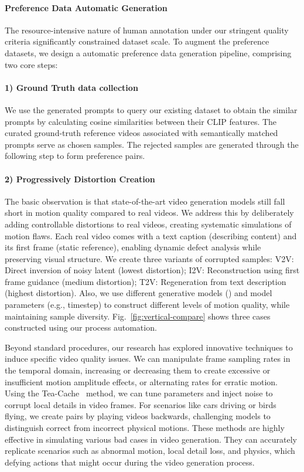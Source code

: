 \documentclass{article}
\begin{document}
{\paragraph{Preference Data Automatic Generation}
The resource-intensive nature of human annotation under our stringent quality criteria significantly constrained dataset scale. To augment the preference datasets, we design a automatic preference data generation pipeline, comprising two core steps: 
\paragraph{1) Ground Truth data collection}
We use the generated prompts to query our existing dataset to obtain the similar prompts by calculating cosine similarities between their CLIP features\cite{radford2021learning}. The curated ground-truth reference videos associated with semantically matched prompts serve as chosen samples. The rejected samples are generated through the following step to form preference pairs.
\paragraph{2) Progressively Distortion Creation}
The basic observation is that state-of-the-art video generation models still fall short in motion quality compared to real videos. We address this by deliberately adding controllable distortions to real videos, creating systematic simulations of motion flaws. Each real video comes with a text caption (describing content) and its first frame (static reference), enabling dynamic defect analysis while preserving visual structure. We create three variants of corrupted samples: V2V: Direct inversion of noisy latent (lowest distortion); I2V: Reconstruction using first frame guidance (medium distortion); T2V: Regeneration from text description (highest distortion). Also, we use different generative models (\cite{wan2025,kong2024hunyuanvideo,yang2024cogvideox}) and model parameters (e.g., timestep) to construct different levels of motion quality, while maintaining sample diversity. Fig.~\ref{fig:vertical-compare} shows three cases constructed using our process automation.

Beyond standard procedures, our research has explored innovative techniques to induce specific video quality issues. We can manipulate frame sampling rates in the temporal domain, increasing or decreasing them to create excessive or insufficient motion amplitude effects, or alternating rates for erratic motion. Using the Tea-Cache~\cite{liu2024timestep} method, we can tune parameters and inject noise to corrupt local details in video frames. For scenarios like cars driving or birds flying, we create pairs by playing videos backwards, challenging models to distinguish correct from incorrect physical motions. These methods are highly effective in simulating various bad cases in video generation. They can accurately replicate scenarios such as abnormal motion, local detail loss, and physics, which defying actions that might occur during the video generation process.

}
\end{document}
